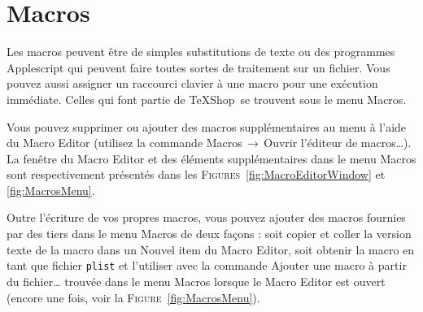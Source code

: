 \documentclass[11pt,french]{article}
\newcommand{\TS}{\textsf{\TeX Shop}}
\newcommand{\mnu}[1]{\textsf{#1}}
\newcommand{\To}{\,\(\to\)\,}
\begin{document}


\section{Macros}

Les macros peuvent être de simples substitutions de texte ou des programmes Applescript qui peuvent faire toutes sortes de traitement sur un fichier. Vous pouvez aussi assigner un raccourci clavier à une macro pour une exécution immédiate. Celles qui font partie de \TS\ se trouvent sous le menu \mnu{Macros}.

Vous pouvez supprimer ou ajouter des macros supplémentaires au menu à l'aide du \mnu{Macro Editor} (utilisez la commande \mnu{Macros}\To\mnu{Ouvrir l'éditeur de macros…}). La fenêtre du \mnu{Macro Editor} et des éléments supplémentaires dans le menu \mnu{Macros} sont respectivement présentés dans les \textsc{Figures}~\ref{fig:MacroEditorWindow} et \ref{fig:MacrosMenu}.

Outre l'écriture de vos propres macros, vous pouvez ajouter des macros fournies par des tiers dans le menu \mnu{Macros} de deux façons : soit copier et coller la version texte de la macro dans un \mnu{Nouvel item} du \mnu{Macro Editor}, soit obtenir la macro en tant que fichier \texttt{plist} et l'utiliser avec la commande \mnu{Ajouter une macro à partir du fichier…} trouvée dans le menu \mnu{Macros} lorsque le \mnu{Macro Editor} est ouvert (encore une fois, voir la \textsc{Figure}~\ref{fig:MacrosMenu}).

%
%
\end{document}

